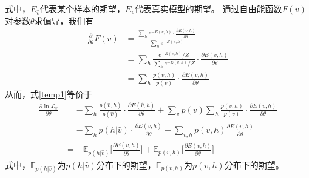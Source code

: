 式中，$E_{\hat{v}}$代表某个样本的期望，$E_{v}$代表真实模型的期望。
\fi
通过自由能函数$F(v)$对参数$\theta$求偏导，我们有
\begin{equation}
\begin{split}
\frac{\partial}{\partial\theta}F(v)
&= \frac{\sum_h e^{-E(v, h)} \cdot \frac{\partial E(v, h)}{\partial \theta}}
{\sum_h e^{-E(v, h)}}\\
&= \sum\limits_h \frac{ e^{-E(v, h)}/Z }{\sum_h e^{-E(v, h)}/Z}\cdot
\frac{\partial E(v, h)}{\partial \theta} \\
&= \sum\limits_h \frac{p(v, h)}{p(v)}\cdot
\frac{\partial E(v, h)}{\partial \theta}
\end{split}
\end{equation}
从而，式\eqref{temp1}等价于
\begin{equation}\label{expectFunc}
\begin{split}
 \frac{\partial\ln\mathcal{L}_{\hat{v}} }{\partial\theta} 
 &=  - \sum\limits_h \frac{p(\hat{v}, h)}{p(\hat{v})} \cdot \frac{\partial E(\hat{v}, h)}{\partial \theta}+ \sum\limits_{v} p(v) \sum\limits_h \frac{p(v, h)}{p(v)}\cdot \frac{\partial E(v, h)}{\partial \theta}\\
 &=  - \sum\limits_h p(h|\hat{v})\cdot \frac{\partial E(\hat{v}, h)}{\partial \theta}
 + \sum\limits_{v, h}p(v, h)\frac{\partial E(v, h)}{\partial \theta}\\
 &= -\mathbb{E}_{p(h|\hat{v})}\bigg[ \frac{\partial E(\hat{v}, h)}{\partial \theta} \bigg]
 + \mathbb{E}_{p(v, h)}\bigg[\frac{\partial E(v, h)}{\partial \theta}\bigg]
 \end{split}
\end{equation}
式中，$\mathbb{E}_{p(h|\hat{v})}$为$p(h|\hat{v})$分布下的期望，$\mathbb{E}_{p(v, h)}$为$p(v, h)$分布下的期望。

